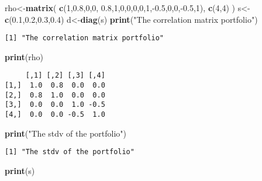 \documentclass[]{article}
\newenvironment{Shaded}{\begin{snugshade}}{\end{snugshade}}
\newcommand{\KeywordTok}[1]{\textcolor[rgb]{0.13,0.29,0.53}{\textbf{{#1}}}}
\newcommand{\DecValTok}[1]{\textcolor[rgb]{0.00,0.00,0.81}{{#1}}}
\newcommand{\FloatTok}[1]{\textcolor[rgb]{0.00,0.00,0.81}{{#1}}}
\newcommand{\StringTok}[1]{\textcolor[rgb]{0.31,0.60,0.02}{{#1}}}
\newcommand{\NormalTok}[1]{{#1}}
\begin{document}
\begin{Shaded}
\begin{Highlighting}[]
\NormalTok{rho<-}\KeywordTok{matrix}\NormalTok{(}
  \KeywordTok{c}\NormalTok{(}\DecValTok{1}\NormalTok{,}\FloatTok{0.8}\NormalTok{,}\DecValTok{0}\NormalTok{,}\DecValTok{0}\NormalTok{, }\FloatTok{0.8}\NormalTok{,}\DecValTok{1}\NormalTok{,}\DecValTok{0}\NormalTok{,}\DecValTok{0}\NormalTok{,}\DecValTok{0}\NormalTok{,}\DecValTok{0}\NormalTok{,}\DecValTok{1}\NormalTok{,-}\FloatTok{0.5}\NormalTok{,}\DecValTok{0}\NormalTok{,}\DecValTok{0}\NormalTok{,-}\FloatTok{0.5}\NormalTok{,}\DecValTok{1}\NormalTok{),}
  \KeywordTok{c}\NormalTok{(}\DecValTok{4}\NormalTok{,}\DecValTok{4}\NormalTok{)}
\NormalTok{)}
\NormalTok{s<-}\KeywordTok{c}\NormalTok{(}\FloatTok{0.1}\NormalTok{,}\FloatTok{0.2}\NormalTok{,}\FloatTok{0.3}\NormalTok{,}\FloatTok{0.4}\NormalTok{)}
\NormalTok{d<-}\KeywordTok{diag}\NormalTok{(s)}
\KeywordTok{print}\NormalTok{(}\StringTok{"The correlation matrix portfolio"}\NormalTok{)}
\end{Highlighting}
\end{Shaded}

\begin{verbatim}
[1] "The correlation matrix portfolio"
\end{verbatim}

\begin{Shaded}
\begin{Highlighting}[]
\KeywordTok{print}\NormalTok{(rho)}
\end{Highlighting}
\end{Shaded}

\begin{verbatim}
     [,1] [,2] [,3] [,4]
[1,]  1.0  0.8  0.0  0.0
[2,]  0.8  1.0  0.0  0.0
[3,]  0.0  0.0  1.0 -0.5
[4,]  0.0  0.0 -0.5  1.0
\end{verbatim}

\begin{Shaded}
\begin{Highlighting}[]
\KeywordTok{print}\NormalTok{(}\StringTok{"The stdv of the portfolio"}\NormalTok{)}
\end{Highlighting}
\end{Shaded}

\begin{verbatim}
[1] "The stdv of the portfolio"
\end{verbatim}

\begin{Shaded}
\begin{Highlighting}[]
\KeywordTok{print}\NormalTok{(s)}
\end{Highlighting}
\end{Shaded}
\end{document}
